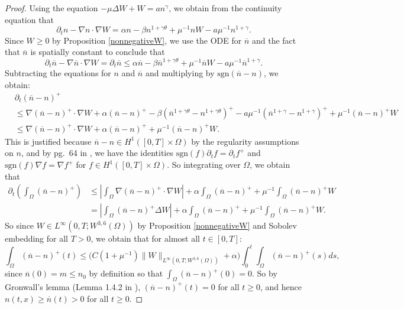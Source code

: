 \documentclass[12pt]{article}
\theoremstyle{plain}
\begin{document}
\begin{proof}
Using the equation $-\mu\Delta W + W = an^{\gamma}$, we obtain from the continuity equation that
\begin{equation*}
\partial_{t}n - \nabla n \cdot \nabla W = \alpha n - \beta n^{1 + \gamma \theta} + \mu^{-1}nW - a\mu^{-1}n^{1 + \gamma}.
\end{equation*}
Since $W \ge 0$ by Proposition \ref{nonnegativeW}, we use the ODE for $\overline{n}$ and the fact that $\overline{n}$ is spatially constant to conclude that
\begin{equation*}
\partial_{t}\overline{n} - \nabla \overline{n} \cdot \nabla W = \partial_{t}\overline{n} \le \alpha \overline{n} - \beta \overline{n}^{1 + \gamma \theta} + \mu^{-1}\overline{n}W - a\mu^{-1} \overline{n}^{1 + \gamma}.
\end{equation*}
Subtracting the equations for $n$ and $\overline{n}$ and multiplying by $\text{sgn}(\overline{n} - n)$, we obtain:
\begin{align*}
&\partial_{t} (\overline{n} - n)^{+} \\
&\le \nabla (\overline{n} - n)^{+} \cdot \nabla W + \alpha (\overline{n} - n)^{+} - \beta (\overline{n}^{1 + \gamma \theta} - n^{1 + \gamma \theta})^{+} - a\mu^{-1} (\overline{n}^{1 + \gamma} - n^{1 + \gamma})^{+} + \mu^{-1}(\overline{n} - n)^{+} W\\
&\le \nabla (\overline{n} - n)^{+} \cdot \nabla W + \alpha (\overline{n} - n)^{+} + \mu^{-1}(\overline{n} - n)^{+}W.
\end{align*}
This is justified because $\overline{n} - n \in H^{1}([0, T] \times \Omega)$ by the regularity assumptions on $n$, and by pg.~64 in \cite{FeireislNovotny}, we have the identities $\text{sgn}(f)\partial_{t}f = \partial_{t}f^+$ and $\text{sgn} (f)\nabla f = \nabla f^{+}$ for $f \in H^{1}([0, T] \times \Omega)$. So integrating over $\Omega$, we obtain that
\begin{align*}
\partial_{t}\left(\int_{\Omega} (\overline{n} - n)^{+}\right) &\le \left|\int_{\Omega} \nabla (\overline{n} - n)^{+} \cdot \nabla W\right| + \alpha \int_{\Omega} (\overline{n} - n)^{+} + \mu^{-1} \int_{\Omega} (\overline{n} - n)^{+}W \\
&= \left|\int_{\Omega} (\overline{n} - n)^{+} \Delta W\right| + \alpha \int_{\Omega} (\overline{n} - n)^{+} + \mu^{-1} \int_{\Omega} (\overline{n} - n)^{+}W.
\end{align*}
So since $W \in L^{\infty}(0, T; W^{3, 6}(\Omega))$ by Proposition \ref{nonnegativeW} and Sobolev embedding for all $T > 0$, we obtain that for almost all $t \in [0, T]$:
\begin{equation*}
\int_{\Omega} (\overline{n} - n)^{+}(t) \le \Big(C(1 + \mu^{-1})\|W\|_{L^{\infty}(0, T; W^{3, 6}(\Omega))} + \alpha\Big) \int_{0}^{t}  \int_{\Omega} (\overline{n} - n)^{+}(s) ds,
\end{equation*}
since $\overline{n}(0) = m \le n_{0}$ by definition so that $\displaystyle \int_{\Omega} (\overline{n} - n)^{+}(0) = 0$. So by Gronwall's lemma (Lemma 1.4.2 in \cite{BFH18}), $(\overline{n} - n)^{+}(t) = 0$ for all $t \ge 0$, and hence $n(t, x) \ge \overline{n}(t) > 0$ for all $t \ge 0$.


\end{proof}
\end{document}
